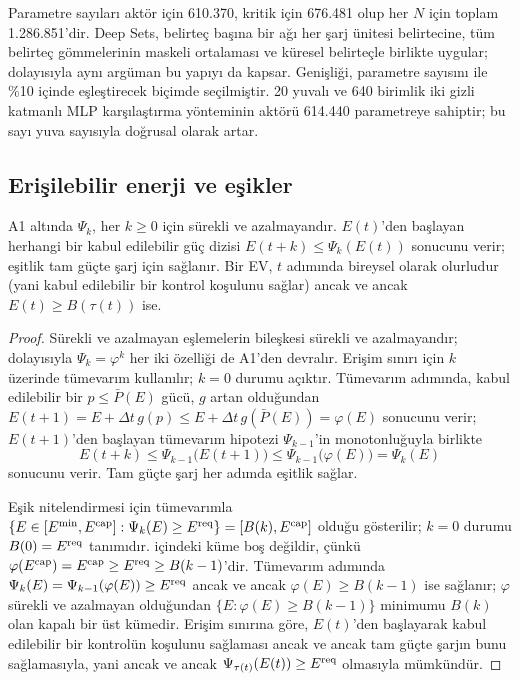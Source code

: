 Parametre sayıları aktör için 610.370, kritik için 676.481 olup her $N$ için toplam 1.286.851'dir.
Deep Sets, belirteç başına bir ağı her şarj ünitesi belirtecine, tüm belirteç gömmelerinin maskeli ortalaması ve küresel belirteçle birlikte uygular; dolayısıyla aynı argüman bu yapıyı da kapsar.
Genişliği, parametre sayısını \method{} ile \%10 içinde eşleştirecek biçimde seçilmiştir. 20 yuvalı ve 640 birimlik iki gizli katmanlı MLP karşılaştırma yönteminin aktörü 614.440 parametreye sahiptir; bu sayı yuva sayısıyla doğrusal olarak artar.

\subsection{Erişilebilir enerji ve eşikler}\label{app:reach}

\begin{lemma}\label{lem:reach}
A1 altında $\Psi_k$, her $k\ge0$ için sürekli ve azalmayandır.
$E(t)$'den başlayan herhangi bir kabul edilebilir güç dizisi $E(t+k)\le\Psi_k(E(t))$ sonucunu verir; eşitlik tam güçte şarj için sağlanır.
Bir EV, $t$ adımında bireysel olarak olurludur (yani kabul edilebilir bir kontrol  koşulunu sağlar) ancak ve ancak $E(t)\ge B(\tau(t))$ ise.
\end{lemma}

\begin{proof}
Sürekli ve azalmayan eşlemelerin bileşkesi sürekli ve azalmayandır; dolayısıyla $\Psi_k=\varphi^{k}$ her iki özelliği de A1'den devralır.
Erişim sınırı için $k$ üzerinde tümevarım kullanılır; $k=0$ durumu açıktır.
Tümevarım adımında, kabul edilebilir bir $p\le\bar P(E)$ gücü, $g$ artan olduğundan $E(t+1)=E+\Delta t\,g(p)\le E+\Delta t\,g(\bar P(E))=\varphi(E)$ sonucunu verir; $E(t+1)$'den başlayan tümevarım hipotezi $\Psi_{k-1}$'in monotonluğuyla birlikte
\[
E(t+k)\le\Psi_{k-1}\big(E(t+1)\big)\le\Psi_{k-1}\big(\varphi(E)\big)=\Psi_k(E)
\]
sonucunu verir.
Tam güçte şarj her adımda eşitlik sağlar.

Eşik nitelendirmesi için tümevarımla $\{E\in[E^{\min},E^{\mathrm{cap}}]:\Psi_k(E)\ge E^{\mathrm{req}}\}=[B(k),E^{\mathrm{cap}}]$ olduğu gösterilir; $k=0$ durumu $B(0)=E^{\mathrm{req}}$ tanımıdır.
 içindeki küme boş değildir, çünkü $\varphi(E^{\mathrm{cap}})=E^{\mathrm{cap}}\ge E^{\mathrm{req}}\ge B(k-1)$'dir.
Tümevarım adımında $\Psi_k(E)=\Psi_{k-1}(\varphi(E))\ge E^{\mathrm{req}}$ ancak ve ancak $\varphi(E)\ge B(k-1)$ ise sağlanır; $\varphi$ sürekli ve azalmayan olduğundan $\{E:\varphi(E)\ge B(k-1)\}$ minimumu $B(k)$ olan kapalı bir üst kümedir.
Erişim sınırına göre, $E(t)$'den başlayarak kabul edilebilir bir kontrolün  koşulunu sağlaması ancak ve ancak tam güçte şarjın bunu sağlamasıyla, yani ancak ve ancak $\Psi_{\tau(t)}(E(t))\ge E^{\mathrm{req}}$ olmasıyla mümkündür.
\end{proof}


